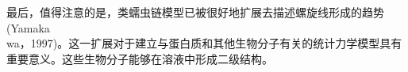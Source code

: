 \documentclass[12pt]{article}
\begin{document}
\begin{CJK}{UTF8}{gkai}
最后，值得注意的是，类蠕虫链模型已被很好地扩展去描述螺旋线形成的趋势(Yamaka\\wa，1997)。这一扩展对于建立与蛋白质和其他生物分子有关的统计力学模型具有重要意义。这些生物分子能够在溶液中形成二级结构。\\

















\end{CJK}
\end{document}
